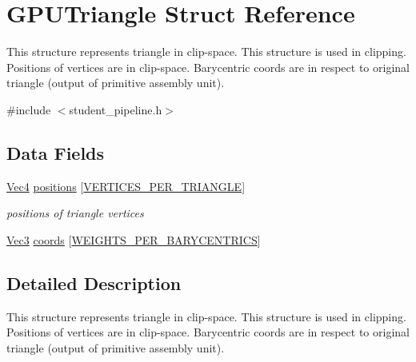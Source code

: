 \hypertarget{structGPUTriangle}{\section{G\-P\-U\-Triangle Struct Reference}
\label{structGPUTriangle}
}


This structure represents triangle in clip-\/space. This structure is used in clipping. Positions of vertices are in clip-\/space. Barycentric coords are in respect to original triangle (output of primitive assembly unit).  




{\ttfamily \#include $<$student\-\_\-pipeline.\-h$>$}

\subsection*{Data Fields}
\begin{DoxyCompactItemize}
\item 
\hypertarget{structGPUTriangle_af33d9eb5648bd43a8098159cd0691bb1}{\hyperlink{structVec4}{Vec4} \hyperlink{structGPUTriangle_af33d9eb5648bd43a8098159cd0691bb1}{positions} \mbox{[}\hyperlink{fwd_8h_a67df0e09b776eea53360bcc8f4a82ac9}{V\-E\-R\-T\-I\-C\-E\-S\-\_\-\-P\-E\-R\-\_\-\-T\-R\-I\-A\-N\-G\-L\-E}\mbox{]}}\label{structGPUTriangle_af33d9eb5648bd43a8098159cd0691bb1}

\begin{DoxyCompactList}\small\item\em positions of triangle vertices \end{DoxyCompactList}\item 
\hyperlink{structVec3}{Vec3} \hyperlink{structGPUTriangle_a1cd3fe2c1979f844528481ee336d4e09}{coords} \mbox{[}\hyperlink{fwd_8h_a6142f59143b2049a17b5318e8655ac86}{W\-E\-I\-G\-H\-T\-S\-\_\-\-P\-E\-R\-\_\-\-B\-A\-R\-Y\-C\-E\-N\-T\-R\-I\-C\-S}\mbox{]}
\end{DoxyCompactItemize}


\subsection{Detailed Description}
This structure represents triangle in clip-\/space. This structure is used in clipping. Positions of vertices are in clip-\/space. Barycentric coords are in respect to original triangle (output of primitive assembly unit). 

